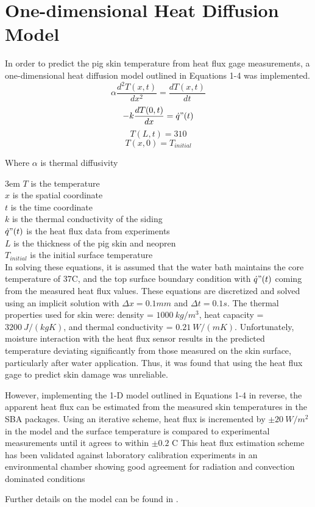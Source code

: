 \clearpage		\large
\chapter{One-dimensional Heat Diffusion Model} \label{App:1D_Heat_Diffusion}

 In order to predict the pig skin temperature from heat flux gage measurements, a one-dimensional heat diffusion model outlined in Equations 1-4 was implemented.
 \begin{equation} \alpha \frac{d^2T(x,t)}{dx^2} = \frac{dT(x,t)}{dt} \end{equation}
 \begin{equation} -k\frac{dT(0,t)}{dx} = \dot{q}"(t) \end{equation}
 \begin{equation} T(L,t) = 310 \end{equation}
 \begin{equation} T(x,0) = T_{initial} \end{equation}

Where $\alpha$ is thermal diffusivity

\noindent\hangindent3em
$T$ is the temperature\\
$x$ is the spatial coordinate\\
$t$ is the time coordinate\\
$k$ is the thermal conductivity of the siding\\
$\dot{q}"(t)$ is the heat flux data from experiments\\
$L$ is the thickness of the pig skin and neopren\\
$T_{initial}$ is the initial surface temperature\\

In solving these equations, it is assumed that the water bath maintains the core temperature of 37\textdegree C, and the top surface boundary condition with $\dot{q}"(t)$ coming from the measured heat flux values. These equations are discretized and solved using an implicit solution with $\Delta x=0.1 mm$ and $\Delta t=0.1 s$. The thermal properties used for skin were: density = $1000\ kg/m^3$, heat capacity = $3200\ J/(kgK)$, and thermal conductivity = $0.21\ W/(mK)$. Unfortunately, moisture interaction with the heat flux sensor results in the predicted temperature deviating significantly from those measured on the skin surface, particularly after water application.  Thus, it was found that using the heat flux gage to predict skin damage was unreliable.

However, implementing the 1-D model outlined in Equations 1-4 in reverse, the apparent heat flux can be estimated from the measured skin temperatures in the SBA packages. Using an iterative scheme, heat flux is incremented by $\pm20\ W/m^2$ in the model and the surface temperature is compared to experimental measurements until it agrees to within $\pm0.2$ \textdegree C This heat flux estimation scheme has been validated against laboratory calibration experiments in an environmental chamber showing good agreement for radiation and convection dominated conditions

Further details on the model can be found in \cite{Residential_Tenability}.




